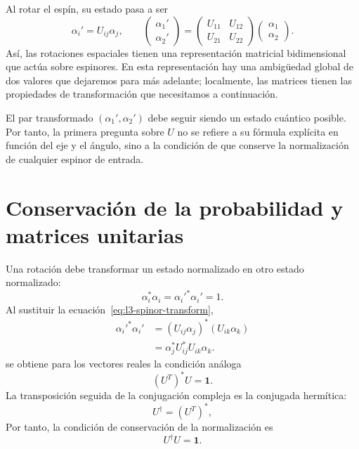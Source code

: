 Al rotar el espín, su estado pasa a ser
\begin{equation}
\alpha_i'=U_{ij}\alpha_j,
\qquad
\begin{pmatrix}\alpha_1'\\\alpha_2'\end{pmatrix}
=
\begin{pmatrix}
U_{11}&U_{12}\\
U_{21}&U_{22}
\end{pmatrix}
\begin{pmatrix}\alpha_1\\\alpha_2\end{pmatrix}.
\label{eq:l3-spinor-transform}
\end{equation}
Así, las rotaciones espaciales tienen una representación matricial bidimensional que actúa sobre espinores. En esta representación hay una ambigüedad global de dos valores que dejaremos para más adelante; localmente, las matrices tienen las propiedades de transformación que necesitamos a continuación.

El par transformado \((\alpha_1',\alpha_2')\) debe seguir siendo un estado cuántico posible. Por tanto, la primera pregunta sobre \(U\) no se refiere a su fórmula explícita en función del eje y el ángulo, sino a la condición de que conserve la normalización de cualquier espinor de entrada.

\section{Conservación de la probabilidad y matrices unitarias}

Una rotación debe transformar un estado normalizado en otro estado normalizado:
\begin{equation}
\alpha_i^*\alpha_i=\alpha_i'^*\alpha_i'=1.
\end{equation}
Al sustituir la ecuación~\eqref{eq:l3-spinor-transform},
\begin{align}
\alpha_i'^*\alpha_i'
 &=(U_{ij}\alpha_j)^*(U_{ik}\alpha_k)\\
 &=\alpha_j^*U_{ij}^*U_{ik}\alpha_k.
\end{align}
se obtiene para los vectores reales la condición análoga
\begin{equation}
(U^T)^*U=\boldsymbol 1.
\end{equation}
La transposición seguida de la conjugación compleja es la conjugada hermítica:
\begin{equation}
U^\dagger=(U^T)^*,
\end{equation}
Por tanto, la condición de conservación de la normalización es
\begin{equation}
U^\dagger U=\boldsymbol 1.
\label{eq:l3-unitarity}
\end{equation}

